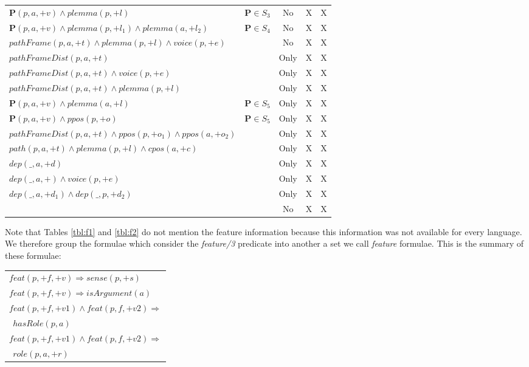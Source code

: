 \begin{table*}[th]
\begin{tabular}{|>{\small}p{10cm}|>{\small}c|>{\small}c|>{\small}c|>{\small}c|}
   $ \mathbf{P}(p,a,+v) \land plemma(p,+l) $ & $\mathbf{P} \in S_3$           & 
   No  & X & X \\
   $ \mathbf{P}(p,a,+v) \land plemma(p,+l_1) \land plemma(a,+l_2) $    &   
   $\mathbf{P} \in S_4$ & No  & X & X \\
   $ pathFrame(p,a,+t) \land plemma(p,+l) \land voice(p,+e) $ &      & No      & 
   X & X \\
   $ pathFrameDist(p,a,+t) $      &  & Only   & X & X \\
   $ pathFrameDist(p,a,+t) \land voice(p,+e) $ &  & Only           & X & X 
   \\
   $ pathFrameDist(p,a,+t) \land plemma(p,+l)$ &  & Only           & X & X 
   \\
   $ \mathbf{P}(p,a,+v) \land plemma(a,+l) $ & $\mathbf{P} \in S_5$ & Only         
   & X & X \\
   $ \mathbf{P}(p,a,+v) \land ppos(p,+o) $ & $\mathbf{P} \in S_5$   & Only        
   & X & X \\
   $ pathFrameDist(p,a,+t) \land ppos(p,+o_1) \land ppos(a,+o_2) $ &  & Only           
   & X & X \\
   $ path(p,a,+t) \land plemma(p,+l) \land cpos(a,+c) $ &  & Only          & X & 
   X \\
   $ dep(\_,a,+d)$  & & Only  & X & X \\
   $ dep(\_,a,+) \land voice(p,+e)$    &  & Only & X & X  \\
   $ dep(\_,a,+d_1) \land dep(\_,p,+d_2)$    & & Only & X & X  \\
   $                 $    &                           & No & X & X \\
\hline
\end{tabular}


\caption{Templates of the local formulae for \emph{hasRole/2} and 
\emph{role/3}. H: head of clause is $hasRole(p,a)$, R: head of clause is 
$role(p,a,+r)$ and $S_1 = \{ppos,plemma\}, S_2=\{frame, unlabelFrame, path\}, S_3= \{frame,pathFrame\},S_4=\{frame,pathFrame,path\}, S_5= \{pathFrameDist, path\} $}
\label{tbl:f2}
\end{table*}

Note that Tables \ref{tbl:f1} and \ref{tbl:f2} do not mention the feature information because 
this information was not available for every language. We therefore group the 
formulae which consider the \emph{feature/3} predicate into another a set we call 
\emph{feature} formulae. This is the summary of these formulae:
\begin{tabular}{p{7.5cm}}
   $ feat(p,+f,+v) \Rightarrow sense(p,+s)    $\\
   $ feat(p,+f,+v) \Rightarrow isArgument(a)    $\\
   $ feat(p,+f,+v1) \land feat(p,f,+v2) \Rightarrow $\\$\ \ hasRole(p,a)    $\\
   $ feat(p,+f,+v1) \land feat(p,f,+v2) \Rightarrow $\\$\ \ role(p,a,+r)   $\\
\end{tabular}


